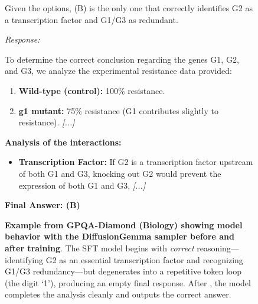\begin{figure}[t]
\begin{minipage}[t]{0.49\textwidth}
\begin{mdframed}[style=afterbox]
\begin{mdframed}[style=thinkbox]
\noindent Given the options, (B) is the only one that correctly identifies G2 as a transcription factor and G1/G3 as redundant.
\end{mdframed}
\vspace{2pt}
\noindent\textit{Response:}
\begin{mdframed}[style=thinkbox]
To determine the correct conclusion regarding the genes G1, G2, and G3, we analyze the experimental resistance data provided:
\begin{enumerate}[leftmargin=12pt, labelsep=4pt, itemsep=0pt, parsep=0pt, topsep=2pt]
\item \textbf{Wild-type (control):} 100\% resistance.
\item \textbf{g1 mutant:} 75\% resistance (G1 contributes slightly to resistance). \textit{[...]}
\end{enumerate}

\noindent\textbf{Analysis of the interactions:}
\begin{itemize}[leftmargin=12pt, labelsep=4pt, itemsep=0pt, parsep=0pt, topsep=2pt]
\item \textbf{Transcription Factor:} If G2 is a transcription factor upstream of both G1 and G3, knocking out G2 would prevent the expression of both G1 and G3, \textit{[...]}
\end{itemize}

\vspace{2pt}
\noindent\textbf{Final Answer: (B)}
\end{mdframed}
\end{mdframed}
\end{minipage}
\caption{\textbf{Example from GPQA-Diamond (Biology) showing model behavior with the DiffusionGemma sampler before and after \sdrl training}. The SFT model begins with \emph{correct} reasoning---identifying G2 as an essential transcription factor and recognizing G1/G3 redundancy---but degenerates into a repetitive token loop (the digit `1'), producing an empty final response. After \sdrl, the model completes the analysis cleanly and outputs the correct answer.}
\label{fig:gpqa-rl-example-biology}
\end{figure}

